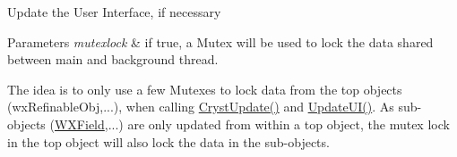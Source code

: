 Update the User Interface, if necessary


\begin{DoxyParams}{Parameters}
{\em mutexlock} & if true, a Mutex will be used to lock the data shared between main and background thread.\\
\hline
\end{DoxyParams}
The idea is to only use a few Mutexes to lock data from the top objects (wx\+Refinable\+Obj,...), when calling \mbox{\hyperlink{class_obj_cryst_1_1_w_x_cryst_obj_basic_a7ac00ae2ae28f1a6fa26e6fa571186b6}{Cryst\+Update()}} and \mbox{\hyperlink{class_obj_cryst_1_1_w_x_cryst_obj_basic_a3818940b7031ff7e45cf2178c4a99c90}{Update\+U\+I()}}. As sub-\/objects (\mbox{\hyperlink{class_obj_cryst_1_1_w_x_field}{W\+X\+Field}},...) are only updated from within a top object, the mutex lock in the top object will also lock the data in the sub-\/objects. 


